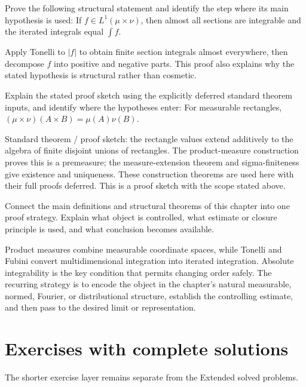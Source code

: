 \begin{problem}\label{prob:iii05-problem-10}
Prove the following structural statement and identify the step where its main hypothesis is used: If $f\in L^1(\mu\times\nu)$, then almost all sections are integrable and the iterated integrals equal $\int f$.
\end{problem}
\begin{solution}
Apply Tonelli to $|f|$ to obtain finite section integrals almost everywhere, then decompose $f$ into positive and negative parts. This proof also explains why the stated hypothesis is structural rather than cosmetic.
\end{solution}

\begin{problem}\label{prob:iii05-problem-11}
Explain the stated proof sketch using the explicitly deferred standard theorem inputs, and identify where the hypotheses enter: For measurable rectangles, $(\mu\times\nu)(A\times B)=\mu(A)\nu(B)$.
\end{problem}
\begin{solution}
Standard theorem / proof sketch: the rectangle values extend additively to the algebra of finite disjoint unions of rectangles. The product-measure construction proves this is a premeasure; the measure-extension theorem and sigma-finiteness give existence and uniqueness. These construction theorems are used here with their full proofs deferred. This is a proof sketch with the scope stated above.
\end{solution}

\begin{problem}\label{prob:iii05-problem-12}
Connect the main definitions and structural theorems of this chapter into one proof strategy. Explain what object is controlled, what estimate or closure principle is used, and what conclusion becomes available.
\end{problem}
\begin{solution}
Product measures combine measurable coordinate spaces, while Tonelli and Fubini convert multidimensional integration into iterated integration. Absolute integrability is the key condition that permits changing order safely. The recurring strategy is to encode the object in the chapter's natural measurable, normed, Fourier, or distributional structure, establish the controlling estimate, and then pass to the desired limit or representation.
\end{solution}
\section{Exercises with complete solutions}
The shorter exercise layer remains separate from the Extended solved problems.

